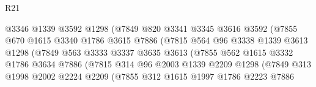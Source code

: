 \begin{lexlean}{R21}
\begin{coremodule}
                                @3346
                                @1339
                                @3592
                                @1298
                                (@7849
                                  @820
                                  @3341
                                  @3345
                                  @3616
                                  @3592
                                  (@7855
                                    @670
                                    @1615
                                    @3340
                                    @1786
                                    @3615
                                    @7886
                                    (@7815
                                      @564
                                      @96
                                      @3338
                                      @1339
                                      @3613
                                      @1298
                                      (@7849
                                        @563
                                        @3333
                                        @3337
                                        @3635
                                        @3613
                                        (@7855
                                          @562
                                          @1615
                                          @3332
                                          @1786
                                          @3634
                                          @7886
                                          (@7815
                                            @314
                                            @96
                                            @2003
                                            @1339
                                            @2209
                                            @1298
                                            (@7849
                                              @313
                                              @1998
                                              @2002
                                              @2224
                                              @2209
                                              (@7855
                                                @312
                                                @1615
                                                @1997
                                                @1786
                                                @2223
                                                @7886

\end{coremodule}
\end{lexlean}
